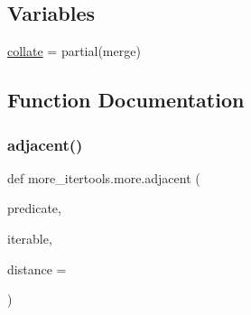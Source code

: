 \subsection*{Variables}
\begin{DoxyCompactItemize}
\item 
\hyperlink{namespacemore__itertools_1_1more_a7ca1edc988761eb755402aaa9ee0c5b9}{collate} = partial(merge)
\end{DoxyCompactItemize}


\subsection{Function Documentation}
\mbox{\label{namespacemore__itertools_1_1more_a9d8438b6750db28c58f458f9484dce45}} 
\subsubsection{\texorpdfstring{adjacent()}{adjacent()}}
{\footnotesize\ttfamily def more\+\_\+itertools.\+more.\+adjacent (\begin{DoxyParamCaption}\item[{}]{predicate,  }\item[{}]{iterable,  }\item[{}]{distance = {} }\end{DoxyParamCaption})}

